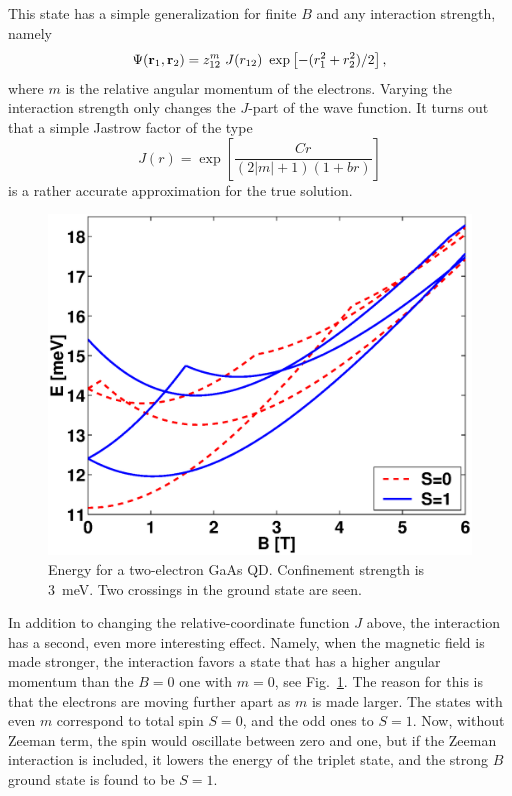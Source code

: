 \documentclass{article}
\begin{document}
This state has a simple generalization for finite $B$ and any interaction
strength, namely
\begin{equation}
\Psi ({\bf r}_{1}, {\bf r}_{2}) = z_{12}^{m} \ J(r_{12}) \ 
\exp\left [-(r_{1}^{2}+r_{2}^{2})/{2}\right ] ,
\label{2e}
\end{equation}
where $m$ is the relative angular momentum of the electrons.  Varying
the interaction strength only changes the $J$-part of the wave
function. It turns out that a simple Jastrow factor of the type
\begin{equation}
J({r})=\exp\left [\frac{
{C r}}{(2|m|+1)(1+b{r})}\right ]
\label{Jastrow}
\end{equation}
is a rather accurate approximation for the true solution\cite{twoe}.

%
\begin{figure}[hbt] 
\begin{center}
 \includegraphics[width=0.79\columnwidth]{Helle_Fig5}
\caption{Energy for a two-electron GaAs QD. Confinement strength is
3~meV. Two crossings in the ground state are seen.}
\label{Meri}
\end{center}
\end{figure}
%
In addition to changing the relative-coordinate function $J$ above,
the interaction has a second, even more interesting effect. Namely,
when the magnetic field is made stronger, the interaction favors a
state that has a higher angular momentum than the $B=0$ one with
$m=0$, see Fig.~\ref{Meri}. The reason for this is that the electrons
are moving further apart as $m$ is made larger. The states with even
$m$ correspond to total spin $S=0$, and the odd ones to $S=1$. Now,
without Zeeman term, the spin would oscillate between zero and one,
but if the Zeeman interaction is included, it lowers the energy of the
triplet state, and the strong $B$ ground state is found to be $S=1$.
\end{document}
